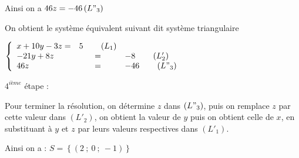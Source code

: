 \documentclass[12pt]{article}
\newcounter{solution}
\begin{document}
	Ainsi on a $46z=-46\left(L"_{3}\right)$

	On obtient le système équivalent suivant dit système triangulaire

	$\left\lbrace\begin{array}{lcl}x+10y-3z =& 5\qquad\left(L_{1}\right)\\-21y+8z& =& -8\qquad\left(L'_{2}\right)\\46z& =& -46\qquad\left(L"_{3}\right)\end{array}\right.$
	
$4^{ième}$ étape :

	Pour terminer la résolution, on détermine $z$ dans $\left(L"_{3}\right)$, puis on remplace $z$ par cette valeur dans $\left(L'_{2}\right)$, on obtient la valeur de $y$ puis on obtient celle de $x$, en substituant à $y$ et $z$ par leurs valeurs respectives dans $\left(L'_{1}\right).$

	Ainsi on a : $S=\left\lbrace(2\ ;\ 0\ ;\ -1)\right\rbrace$
\end{document}
